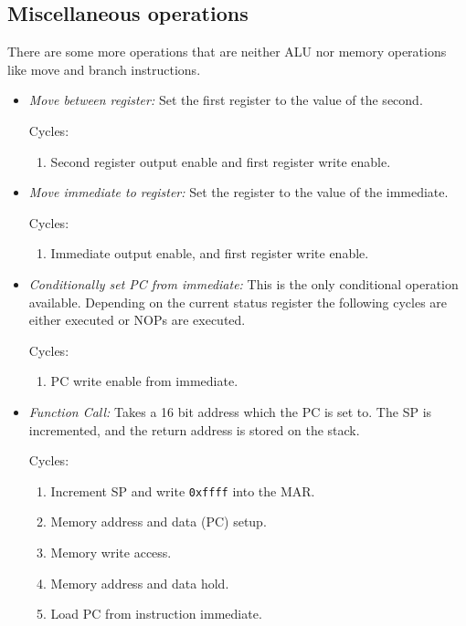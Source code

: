 \subsection{Miscellaneous operations}
There are some more operations that are neither \gls{ALU} nor memory operations like move and branch instructions.
\begin{itemize}
  \item \emph{Move between register:} Set the first register to the value of the second.

  Cycles:
  \begin{enumerate}
    \item Second register output enable and first register write enable.
  \end{enumerate}

  \item \emph{Move immediate to register:} Set the register to the value of the immediate.

  Cycles:
  \begin{enumerate}
    \item Immediate output enable, and first register write enable.
  \end{enumerate}

  \item \emph{Conditionally set \gls{PC} from immediate:} This is the only conditional operation available.
  Depending on the current status register the following cycles are either executed or \glspl{NOP} are executed.

  Cycles:
  \begin{enumerate}
    \item \gls{PC} write enable from immediate.
  \end{enumerate}

  \item \emph{Function Call:} Takes a 16 bit address which the \gls{PC} is set to.
  The \gls{SP} is incremented, and the return address is stored on the stack.

  Cycles:
  \begin{enumerate}
    \item Increment \gls{SP} and write \texttt{0xffff} into the \gls{MAR}.
    \item Memory address and data (\gls{PC}) setup.
    \item Memory write access.
    \item Memory address and data hold.
    \item Load \gls{PC} from instruction immediate.
  \end{enumerate}


\end{itemize}
